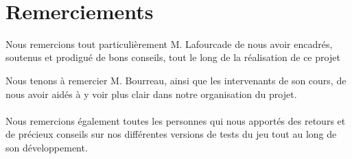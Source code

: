 \documentclass [a4 paper,11pt]{report}
\begin{document}
\newcommand{\HRule}{\rule{\linewidth}{0.5mm}}

\pagestyle{fancy}
\renewcommand\headrulewidth{1pt}
\fancyhead[L]{}
\fancyhead[R]{\leftmark}



\newpage 
~
\thispagestyle{empty}

\newpage

\thispagestyle{empty}
\section*{Remerciements}

Nous remercions tout particulièrement M. Lafourcade de nous avoir encadrés, soutenus et prodigué de bons conseils, tout le long de la réalisation de ce projet

Nous tenons à remercier M. Bourreau, ainsi que les intervenants de son cours, de nous avoir aidés à y voir plus clair dans notre organisation du projet.

\paragraph{}
Nous remercions également toutes les personnes qui nous apportés des retours et de précieux conseils sur nos différentes versions de tests du jeu tout au long de son développement.


\newpage

\setcounter{page}{1}
\tableofcontents

\newpage

\listoffigures

\newpage 



\newpage



\newpage




\newpage



\newpage



\newpage



\newpage



\newpage


\end{document}
